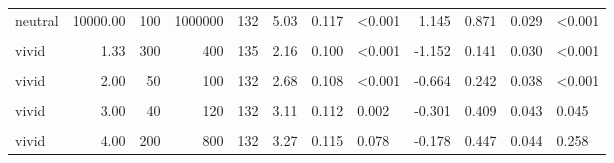 \documentclass[
]{article}
\begin{document}
\begin{longtable}[t]{lrrrrrrlrrrl}
\hspace{1em}neutral & 10000.00 & 100 & 1000000 & 132 & 5.03 & 0.117 & <0.001 & 1.145 & 0.871 & 0.029 & <0.001\\
\hspace{1em}\cellcolor{gray!10}{vivid} & \cellcolor{gray!10}{1.33} & \cellcolor{gray!10}{30} & \cellcolor{gray!10}{40} & \cellcolor{gray!10}{132} & \cellcolor{gray!10}{2.24} & \cellcolor{gray!10}{0.115} & \cellcolor{gray!10}{<0.001} & \cellcolor{gray!10}{-0.953} & \cellcolor{gray!10}{0.136} & \cellcolor{gray!10}{0.030} & \cellcolor{gray!10}{<0.001}\\
\hspace{1em}vivid & 1.33 & 300 & 400 & 135 & 2.16 & 0.100 & <0.001 & -1.152 & 0.141 & 0.030 & <0.001\\
\hspace{1em}\cellcolor{gray!10}{vivid} & \cellcolor{gray!10}{2.00} & \cellcolor{gray!10}{20} & \cellcolor{gray!10}{40} & \cellcolor{gray!10}{135} & \cellcolor{gray!10}{2.45} & \cellcolor{gray!10}{0.103} & \cellcolor{gray!10}{<0.001} & \cellcolor{gray!10}{-0.882} & \cellcolor{gray!10}{0.193} & \cellcolor{gray!10}{0.034} & \cellcolor{gray!10}{<0.001}\\
\hspace{1em}vivid & 2.00 & 50 & 100 & 132 & 2.68 & 0.108 & <0.001 & -0.664 & 0.242 & 0.038 & <0.001\\
\hspace{1em}\cellcolor{gray!10}{vivid} & \cellcolor{gray!10}{3.00} & \cellcolor{gray!10}{10} & \cellcolor{gray!10}{30} & \cellcolor{gray!10}{135} & \cellcolor{gray!10}{2.49} & \cellcolor{gray!10}{0.113} & \cellcolor{gray!10}{<0.001} & \cellcolor{gray!10}{-0.772} & \cellcolor{gray!10}{0.215} & \cellcolor{gray!10}{0.036} & \cellcolor{gray!10}{<0.001}\\
\hspace{1em}vivid & 3.00 & 40 & 120 & 132 & 3.11 & 0.112 & 0.002 & -0.301 & 0.409 & 0.043 & 0.045\\
\hspace{1em}\cellcolor{gray!10}{vivid} & \cellcolor{gray!10}{4.00} & \cellcolor{gray!10}{20} & \cellcolor{gray!10}{80} & \cellcolor{gray!10}{135} & \cellcolor{gray!10}{2.87} & \cellcolor{gray!10}{0.115} & \cellcolor{gray!10}{<0.001} & \cellcolor{gray!10}{-0.476} & \cellcolor{gray!10}{0.348} & \cellcolor{gray!10}{0.041} & \cellcolor{gray!10}{<0.001}\\
\hspace{1em}vivid & 4.00 & 200 & 800 & 132 & 3.27 & 0.115 & 0.078 & -0.178 & 0.447 & 0.044 & 0.258\\

\end{longtable}
\end{document}
